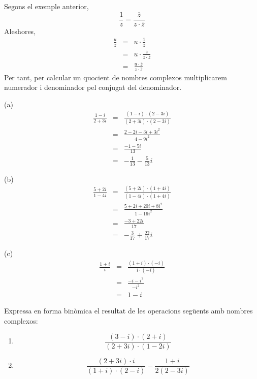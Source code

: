 \begin{solucio}
Segons el exemple anterior,
\begin{equation*}
\frac{1}{z}=\frac{\overline{z}}{z\cdot \overline{z}}
\end{equation*}
Aleshores,
\begin{eqnarray*}
\frac{u}{z} &=&u\cdot \frac{1}{z} \\
&=&u\cdot \frac{\overline{z}}{z\cdot \overline{z}} \\
&=&\frac{u\cdot \overline{z}}{z\cdot \overline{z}}
\end{eqnarray*}
Per tant, per calcular un quocient de nombres complexos
multiplicarem numerador i denominador pel conjugat del denominador.

(a)
\begin{eqnarray*}
\frac{1-i}{2+3i} &=&\frac{(1-i)\cdot (2-3i)}{(2+3i)\cdot (2-3i)} \\
&=&\frac{2-2i-3i+3i^{2}}{4-9i^{2}} \\
&=&\frac{-1-5i}{13} \\
&=&-\frac{1}{13}-\frac{5}{13}i
\end{eqnarray*}

(b)
\begin{eqnarray*}
\frac{5+2i}{1-4i} &=&\frac{(5+2i)\cdot (1+4i)}{(1-4i)\cdot (1+4i)} \\
&=&\frac{5+2i+20i+8i^{2}}{1-16i^{2}} \\
&=&\frac{-3+22i}{17} \\
&=&-\frac{3}{17}+\frac{22}{17}i
\end{eqnarray*}

(c)
\begin{eqnarray*}
\frac{1+i}{i} &=&\frac{(1+i)\cdot (-i)}{i\cdot (-i)} \\
&=&\frac{-i-i^{2}}{-i^{2}} \\
&=&1-i
\end{eqnarray*}
\end{solucio}

\begin{exemple}
Expressa en forma binòmica el resultat de les operacions següents amb
nombres complexos:

\begin{enumerate}
\item[a)]
\begin{equation*}
\frac{(3-i)\cdot (2+i)}{(2+3i)\cdot (1-2i)}
\end{equation*}

\item[b)]
\begin{equation*}
\frac{(2+3i)\cdot i}{(1+i)\cdot (2-i)}-\frac{1+i}{2(2-3i)}
\end{equation*}
\end{enumerate}
\end{exemple}

